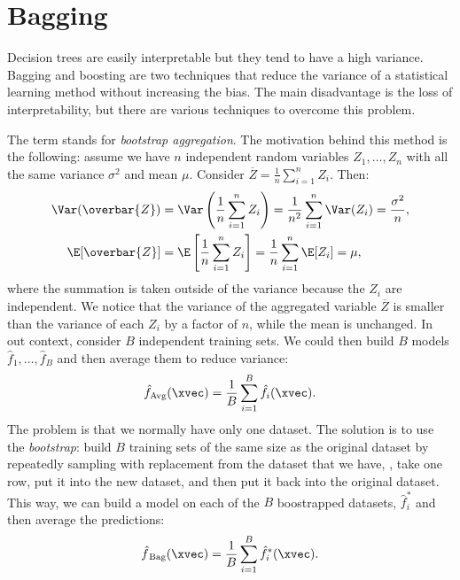 \section{Bagging}

Decision trees are easily interpretable but they tend to have a high variance. Bagging and boosting are two techniques that reduce the variance of a statistical learning method without increasing the bias. The main disadvantage is the loss of interpretability, but there are various techniques to overcome this problem.

The term stands for \emph{bootstrap aggregation}. The motivation behind this method is the following: assume we have $n$ independent random variables $Z_1, \dots, Z_n$ with all the same variance $\sigma^2$ and mean $\mu$. Consider $\overbar{Z} = \frac{1}{n} \sum_{i=1}^n Z_i$. Then:
\begin{equation}
    \begin{aligned}
        \Var(\overbar{Z}) &= \Var\left( \frac{1}{n} \sum_{i=1}^n Z_i \right) = \frac{1}{n^2} \sum_{i=1}^n \Var(Z_i) = \frac{\sigma^2}{n},\\
        \E[\overbar{Z}] &= \E\left[ \frac{1}{n} \sum_{i=1}^n Z_i \right] = \frac{1}{n} \sum_{i=1}^n \E[Z_i] = \mu,
    \end{aligned}
\end{equation}
where the summation is taken outside of the variance because the $Z_i$ are independent. We notice that the variance of the aggregated variable $\overbar{Z}$ is smaller than the variance of each $Z_i$ by a factor of $n$, while the mean is unchanged. In out context, consider $B$ independent training sets. We could then build $B$ models $\hat{f}_1, \dots, \hat{f}_B$ and then average them to reduce variance:
\begin{equation}
    \hat{f}_{\text{Avg}}(\xvec) = \frac{1}{B} \sum_{i=1}^B \hat{f}_i(\xvec).
\end{equation}
The problem is that we normally have only one dataset. The solution is to use the \emph{bootstrap}: build $B$ training sets of the same size as the original dataset by repeatedly sampling with replacement from the dataset that we have, \ie, take one row, put it into the new dataset, and then put it back into the original dataset. This way, we can build a model on each of the $B$ boostrapped datasets, $\hat{f}^*_i$ and then average the predictions:
\begin{equation}
    \hat{f}_{\,\text{Bag}}(\xvec) = \frac{1}{B} \sum_{i=1}^B \hat{f}^*_i(\xvec).
\end{equation}

